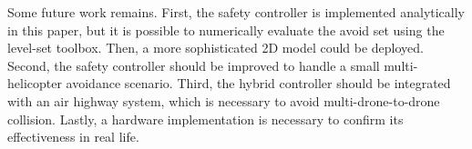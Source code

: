 \documentclass[journal,11pt,onecolumn,draftclsnofoot,]{IEEEtran}
\begin{document}
Some future work remains. First, the safety controller is implemented analytically in this paper, but it is possible to numerically evaluate the avoid set using the level-set toolbox. Then, a more sophisticated 2D model could be deployed. Second, the safety controller should be improved to handle a small multi-helicopter avoidance scenario. Third, the hybrid controller should be integrated with an air highway system, which is necessary to avoid multi-drone-to-drone collision. Lastly, a hardware implementation is necessary to confirm its effectiveness in real life.

%
%
%
%
%
%
%
\end{document}
